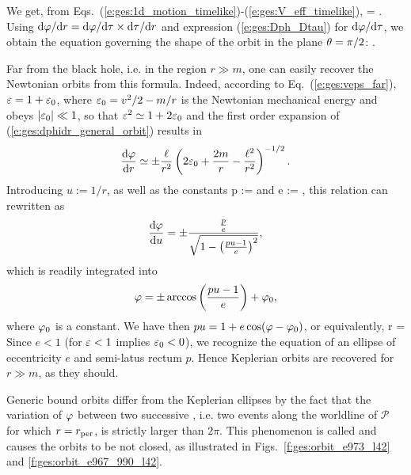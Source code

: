 We get, from Eqs.~(\ref{e:ges:1d_motion_timelike})-(\ref{e:ges:V_eff_timelike}),
\be
     = \pm
     .
\ee
Using $\mathrm{d}\varphi/\mathrm{d} r = \mathrm{d}\varphi /\mathrm{d}\tau \times \mathrm{d}\tau/\mathrm{d} r$ and expression
(\ref{e:ges:Dph_Dtau}) for $\mathrm{d}\varphi /\mathrm{d}\tau$, we obtain the equation governing
the shape of the orbit in the plane $\theta=\pi/2$:
\be \label{e:ges:dphidr_general_orbit}
     .
\ee
\begin{remark}
Far from the black hole, i.e. in the region $r\gg m$, one can easily recover
the Newtonian orbits from this formula. Indeed, according to
Eq.~(\ref{e:ges:veps_far}), $\varepsilon = 1 + \varepsilon_0$, where $\varepsilon_0 = v^2/2 -m/r$  is
the Newtonian mechanical energy and obeys $|\varepsilon_0|\ll 1$, so that $\varepsilon^2 \simeq 1 + 2\varepsilon_0$
and the first order expansion of (\ref{e:ges:dphidr_general_orbit}) results in
\[
    \frac{\mathrm{d} \varphi}{\mathrm{d} r} \simeq \pm \frac{\ell}{r^2}
        \left( 2\varepsilon_0 +  \frac{2m}{r} - \frac{\ell^2}{r^2} \right) ^{-1/2} .
\]
Introducing $u := 1/r$, as well as the constants
\be
    p :=  \qquad\mbox{and}\qquad
    e := ,
\ee
this relation can rewritten as
\[
    \frac{\mathrm{d} \varphi}{\mathrm{d} u} = \pm \frac{\frac{p}{e}}{\sqrt{1 - \left(\frac{pu-1}{e}\right) ^2}} ,
\]
which is readily integrated into
\[
    \varphi = \pm \arccos \left(\frac{pu-1}{e}\right) + \varphi_0 ,
\]
where $\varphi_0$ is a constant. We have then $pu = 1 + e\cos(\varphi-\varphi_0)$, or
equivalently,
\be
    r = 
\ee
Since $e<1$ (for $\varepsilon < 1$ implies $\varepsilon_0 < 0$), we recognize the equation
of an ellipse of eccentricity $e$ and semi-latus rectum $p$. Hence Keplerian orbits are recovered for $r\gg m$, as they should.
\end{remark}

Generic bound orbits differ from the Keplerian ellipses by the fact that
the variation of $\varphi$ between two successive ,
i.e. two events along the worldline of $\mathscr{P}$ for which $r=r_{\rm per}$,
is strictly larger than $2\pi$. This phenomenon is called 
and causes the orbits to be not closed, as illustrated in Figs.~\ref{f:ges:orbit_e973_l42} and
\ref{f:ges:orbit_e967_990_l42}.



